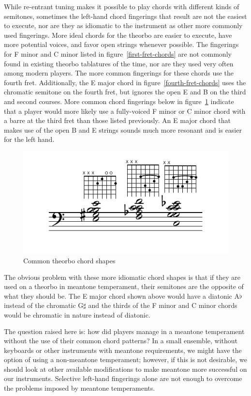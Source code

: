 While re-entrant tuning makes it possible to play chords with different kinds of
semitones, sometimes the left-hand chord fingerings that result are not the easiest to
execute, nor are they as idiomatic to the instrument as other more commonly used
fingerings. More ideal chords for the theorbo are easier to execute, have more potential
voices, and favor open strings whenever possible. The fingerings for F
minor and C minor listed in figure~\ref{first-fret-chords} are not commonly found in
existing theorbo tablatures of the time, nor are they used very often among modern
players. The more common fingerings for these chords use the fourth fret.
Additionally, the E major chord in figure~\ref{fourth-fret-chords} uses the chromatic
semitone on the fourth fret, but ignores the open E and B on the third and second
courses. More common chord fingerings below in figure~\ref{common-chords} indicate that
a player would more likely use a fully-voiced F minor or C minor chord with a barre at
the third fret than those listed previously. An E major chord that makes use of the
open B and E strings sounds much more resonant and is easier for the left hand.
\begin{figure}[h]
\centering
\includegraphics{examples/common-chords.pdf}
\caption{Common theorbo chord shapes}
\label{common-chords}
\end{figure}
The obvious problem with these more idiomatic chord shapes is that if they are used on
a theorbo in meantone temperament, their semitones are the opposite of what they should be.
The E major chord shown above would have a diatonic A$\flat$ instead of the chromatic
G$\sharp$ and the thirds of the F minor and C minor chords would be chromatic in nature
instead of diatonic.

The question raised here is: how did players manage in a meantone temperament
without the use of their common chord patterns? In a small ensemble, without
keyboards or other instruments with meantone requirements, we might have the
option of using a non-meantone temperament; however, if this is not desirable,
we should look at other available modifications to make meantone more successful
on our instruments. Selective left-hand fingerings alone are not enough to overcome
the problems imposed by meantone temperaments.

